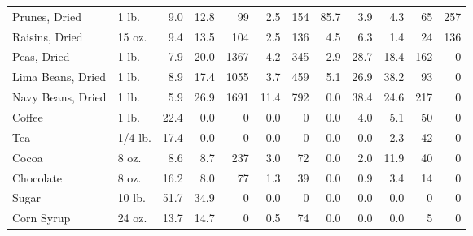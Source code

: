 \documentclass[
  ignorenonframetext,
]{beamer}
\begin{document}
\begin{frame}[fragile]
\begin{tabular}{llrrrrrrrrrr}
Prunes, Dried           &       1 lb. &                 9.0 &      12.8 &           99 &          2.5 &        154 &            85.7 &            3.9 &              4.3 &           65 &                 257 \\
Raisins, Dried          &      15 oz. &                 9.4 &      13.5 &          104 &          2.5 &        136 &             4.5 &            6.3 &              1.4 &           24 &                 136 \\
Peas, Dried             &       1 lb. &                 7.9 &      20.0 &         1367 &          4.2 &        345 &             2.9 &           28.7 &             18.4 &          162 &                   0 \\
Lima Beans, Dried       &       1 lb. &                 8.9 &      17.4 &         1055 &          3.7 &        459 &             5.1 &           26.9 &             38.2 &           93 &                   0 \\
Navy Beans, Dried       &       1 lb. &                 5.9 &      26.9 &         1691 &         11.4 &        792 &             0.0 &           38.4 &             24.6 &          217 &                   0 \\
Coffee                  &       1 lb. &                22.4 &       0.0 &            0 &          0.0 &          0 &             0.0 &            4.0 &              5.1 &           50 &                   0 \\
Tea                     &     1/4 lb. &                17.4 &       0.0 &            0 &          0.0 &          0 &             0.0 &            0.0 &              2.3 &           42 &                   0 \\
Cocoa                   &       8 oz. &                 8.6 &       8.7 &          237 &          3.0 &         72 &             0.0 &            2.0 &             11.9 &           40 &                   0 \\
Chocolate               &       8 oz. &                16.2 &       8.0 &           77 &          1.3 &         39 &             0.0 &            0.9 &              3.4 &           14 &                   0 \\
Sugar                   &      10 lb. &                51.7 &      34.9 &            0 &          0.0 &          0 &             0.0 &            0.0 &              0.0 &            0 &                   0 \\
Corn Syrup              &      24 oz. &                13.7 &      14.7 &            0 &          0.5 &         74 &             0.0 &            0.0 &              0.0 &            5 &                   0 \\

\end{tabular}
\end{frame}
\end{document}

